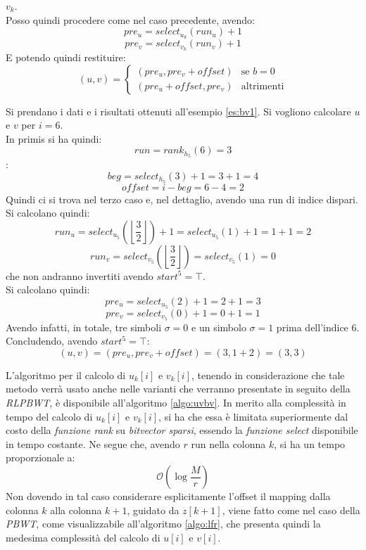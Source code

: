 \begin{enumerate}
\begin{enumerate}
    $v_k$.\\ 
    Posso quindi procedere come nel caso precedente, avendo:
    \begin{equation}
      \label{eq:bv18}
      pre_u=select_{u_k}(run_u)+1
    \end{equation}
    \begin{equation}
      \label{eq:bv19}
      pre_v=select_{v_k}(run_v)+1
    \end{equation}
    E potendo quindi restituire:
    \begin{equation}
      \label{eq:bv20}
      (u,v)=
      \begin{cases}
        (pre_u,pre_v+offset)&\mbox{se } b=0\\
        (pre_u+offset,pre_v)&\mbox{altrimenti}
      \end{cases}
    \end{equation}
  \end{enumerate}
\end{enumerate}
\begin{esempio}
  Si prendano i dati e i risultati ottenuti all'esempio \ref{es:bv1}. Si
  vogliono calcolare $u$ e $v$ per $i=6$.\\
  In primis si ha quindi:
  \[run=rank_{h_5}(6)=3\]:
  \[beg = select_{h_5}(3)+1=3+1=4\]
  \[offset = i-beg=6-4=2\]
  Quindi ci si trova nel terzo caso e, nel dettaglio, avendo una run di
  indice dispari. Si calcolano quindi:
  \[run_u=select_{u_5}\left(\left\lfloor\frac{3}{2}\right\rfloor\right)+1=
    select_{u_5}(1)+1 =1+1=2\] 
  \[run_v=select_{v_5}\left(\left\lfloor\frac{3}{2}\right\rfloor\right)=
    select_{v_5}(1)=0\] 
  che non andranno invertiti avendo $start^5=\top$.\\
  Si calcolano quindi:
  \[pre_u=select_{u_5}(2)+1=2+1=3\]
  \[pre_v=select_{v_5}(0)+1=0+1=1\]
  Avendo infatti, in totale, tre simboli $\sigma=0$ e un simbolo $\sigma=1$
  prima dell'indice 6.\\ 
  Concludendo, avendo $start^5=\top$:
  \[(u,v)=(pre_u, pre_v + offset)=(3,1+2)=(3,3)\]
\end{esempio}
L'algoritmo per il calcolo di $u_k[i]$ e $v_k[i]$, tenendo in considerazione che
tale 
metodo verrà usato anche nelle varianti che verranno presentate in seguito della
\textit{RLPBWT}, è disponibile all'algoritmo \ref{algo:uvbv}. In merito alla
complessità in tempo del calcolo di $u_k[i]$ e $v_k[i]$, si ha che essa è
limitata superiormente dal costo della \textit{funzione rank} su
\textit{bitvector sparsi}, essendo la \textit{funzione select} disponibile in
tempo costante. Ne segue che, avendo $r$ run nella colonna $k$, si ha un tempo
proporzionale a:
\begin{equation}
  \label{eq:bvuvtime}
  \mathcal{O}\left(\log\frac{M}{r}\right)
\end{equation}
Non dovendo in tal
caso considerare esplicitamente l'offset il mapping dalla colonna $k$ alla
colonna $k+1$, guidato da $z[k+1]$, viene fatto come nel caso della
\textit{PBWT}, come visualizzabile all'algoritmo \ref{algo:lfr}, che presenta
quindi la medesima complessità del calcolo di $u[i]$ e $v[i]$.

